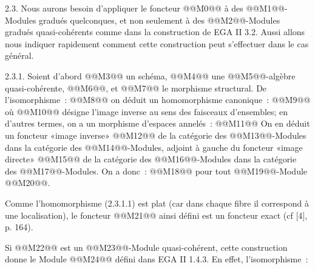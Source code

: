 
2.3.
Nous aurons besoin d'appliquer le foncteur @@M0@@ à des @@M1@@-Modules gradués quelconques, et non seulement à des @@M2@@-Modules gradués quasi-cohérents comme dans la construction de EGA II 3.2. Aussi allons nous indiquer rapidement comment cette construction peut s'effectuer dans le cas général.

2.3.1. Soient d'abord @@M3@@ un schéma, @@M4@@ une @@M5@@-algèbre quasi-cohérente, @@M6@@, et @@M7@@ le morphisme structural. De l'isomorphisme~:
@@M8@@
on déduit un homomorphisme canonique~:
@@M9@@
où @@M10@@ désigne l'image inverse au sens des faisceaux d'ensembles; en d'autres termes, on a un morphisme d'espaces annelés~:
@@M11@@
On en déduit un foncteur «image inverse» @@M12@@ de la catégorie des @@M13@@-Modules dans la catégorie des @@M14@@-Modules, adjoint à gauche du foncteur «image directe» @@M15@@ de la catégorie des @@M16@@-Modules dans la catégorie des @@M17@@-Modules. On a donc~:
@@M18@@
pour tout @@M19@@-Module @@M20@@.

Comme l'homomorphisme (2.3.1.1) est plat (car dans chaque fibre il correspond à une localisation), le foncteur @@M21@@ ainsi défini est un foncteur exact (cf [4], p. 164).

Si @@M22@@ est un @@M23@@-Module quasi-cohérent, cette construction donne le Module @@M24@@ défini dans EGA II 1.4.3. En effet, l'isomorphisme~:
